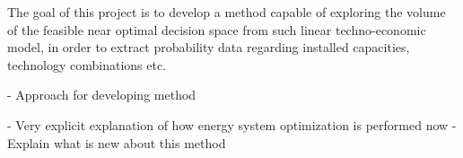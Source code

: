 The goal of this project is to develop a method capable of exploring the volume of the feasible near optimal decision space from such linear techno-economic model, in order to extract probability data regarding installed capacities, technology combinations etc. 

- Approach for developing method

- Very explicit explanation of how energy system optimization is performed now
- Explain what is new about this method 

\begin{comment}
- Increased demand and a need to reduce CO2 emmisions 
- Fundamental change is needed (policy wise)
- Energy-economy models is an important tool 
- Modelers should focus on robust insights rather than point estimates
- Uncertainty in the models (Structural and parametric)
- Structural uncertainty is addressed with higher comlexity
- Parametric uncertainty is addressed with running multiple scenarios or sensitivity analysis
- Scenario approach does not include less expected real-world developments 
- Little to none possibility to validate models 
\end{comment}





\begin{comment}
- MGA \cite{Brill_MGA_1982}
- Feasible near optimal decision space 

Alternative solutions generated with energy-economy
optimization models also provide valuable insight that can be used to
challenge preconceptions and suggest creative alternatives to decision makers.
\end{comment}


